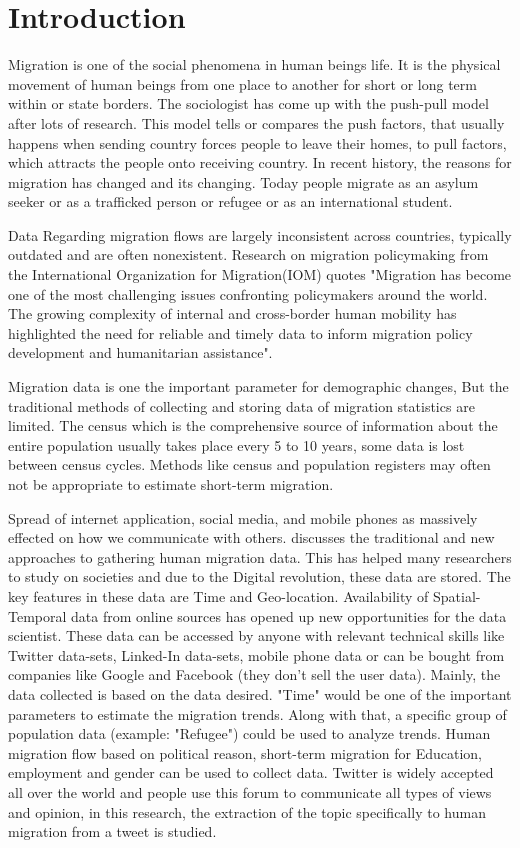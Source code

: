 \chapter{Introduction}\label{chap:introduction}
Migration is one of the social phenomena in human beings life. It is the physical movement of human beings from one place to another for short or long term within or state borders. The sociologist has come up with the push-pull model after lots of research. This model tells or compares the push factors, that usually happens when sending country forces people to leave their homes, to pull factors, which attracts the people onto receiving country. In recent history, the reasons for migration has changed and its changing. Today people migrate as an asylum seeker or as a trafficked person or refugee or as an international student.

Data Regarding migration flows are largely inconsistent across countries, typically outdated and
are often nonexistent. Research on migration policymaking from the International Organization for
Migration(IOM)  \cite{IOM's} quotes "Migration has become one of the most challenging issues confronting
policymakers around the world. The growing complexity of internal and cross-border human mobility
has highlighted the need for reliable and timely data to inform migration policy development
and humanitarian assistance". 

Migration data is one the important parameter for demographic changes, But the traditional methods of collecting and storing data of migration statistics are limited. The census which is the comprehensive source of information about the entire population usually takes place every 5 to 10 years, some data is lost between census cycles. Methods like census and population registers may often not be appropriate to estimate short-term migration. 

Spread of internet application, social media, and mobile phones as massively effected on how we communicate with others. \cite{Christina_Hughes_et_al.} discusses the traditional and new approaches to gathering human migration data. This has helped many researchers to study on societies and due to the Digital revolution, these data are stored. The key features in these data are Time and Geo-location. Availability of Spatial-Temporal data from online sources has opened up new opportunities for the data scientist. These data can be accessed by anyone with relevant technical skills like Twitter data-sets, Linked-In data-sets, mobile phone data or can be bought from companies like Google and Facebook (they don't sell the user data). Mainly, the data collected is based on the data desired. "Time" would be one of the important parameters to estimate the migration trends. Along with that, a specific group of population data (example: "Refugee") could be used to analyze trends. Human migration flow based on political reason, short-term migration for Education, employment and gender can be used to collect data. Twitter is widely accepted all over the world and people use this forum to communicate all types of views and opinion, in this research, the extraction of the topic specifically to human migration from a tweet is studied. 


